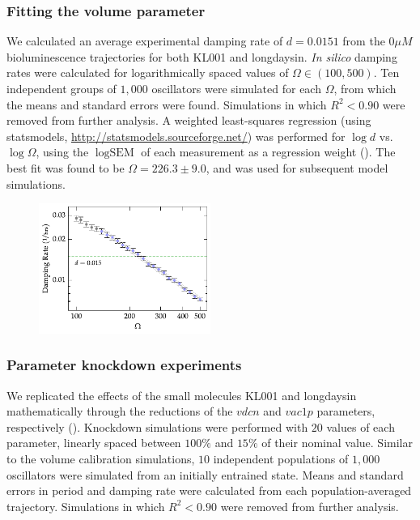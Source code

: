 \subsubsection{Fitting the volume parameter}
We calculated an average experimental damping rate of $d = 0.0151$ from the $0 \mu M$ bioluminescence trajectories for both KL001 and longdaysin.
{\itshape In silico} damping rates were calculated for logarithmically spaced values of $\Omega \in (100, 500)$.
Ten independent groups of $1,000$ oscillators were simulated for each $\Omega$, from which the means and standard errors were found.
Simulations in which $R^2 < 0.90$ were removed from further analysis.
A weighted least-squares regression (using statsmodels, \url{http://statsmodels.sourceforge.net/}) was performed for $\log d$ vs.\ $\log \Omega$, using the $\log \text{SEM}$ of each measurement as a regression weight ().
The best fit was found to be $\Omega = 226.3 \pm 9.0$, and was used for subsequent model simulations.

\begin{figure}[tbp]
  \begin{center}
    \includegraphics[width=0.5\textwidth]{chap6/figures/volume_calibration.pdf}
  \end{center}
\label{fig:vol_calibration}
\end{figure}

\subsubsection{Parameter knockdown experiments}
We replicated the effects of the small molecules KL001 and longdaysin mathematically through the reductions of the $vdcn$ and $vac1p$ parameters, respectively ().
Knockdown simulations were performed with $20$ values of each parameter, linearly spaced between $100\%$ and $15\%$ of their nominal value.
Similar to the volume calibration simulations, $10$ independent populations of $1,000$ oscillators were simulated from an initially entrained state.
Means and standard errors in period and damping rate were calculated from each population-averaged trajectory.
Simulations in which $R^2 < 0.90$ were removed from further analysis.

